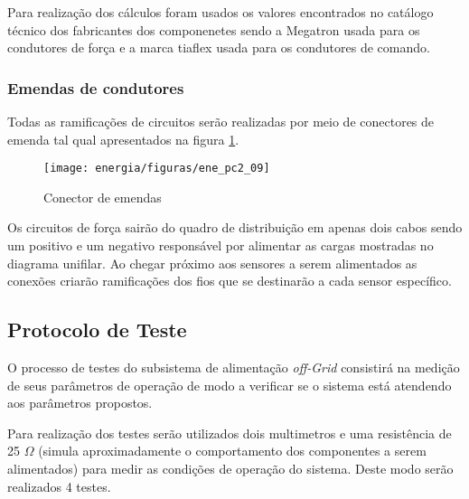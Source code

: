 Para realização dos cálculos foram usados os valores encontrados no catálogo técnico dos fabricantes dos componenetes sendo a Megatron usada para os condutores de força e a marca tiaflex usada para os condutores de comando.

\subsubsection{Emendas de condutores}

Todas as ramificações de circuitos serão realizadas por meio de conectores de emenda tal qual apresentados na figura \ref{ene_pc2_09}. 

\begin{figure}[H]
		\centering
		\texttt{[image: energia/figuras/ene\_pc2\_09]}
		\caption{Conector de emendas}
		\label{ene_pc2_09}
\end{figure}

Os circuitos de força sairão do quadro de distribuição em apenas dois cabos sendo um positivo e um negativo responsável por alimentar as cargas mostradas no diagrama unifilar. Ao chegar próximo aos sensores a serem alimentados as conexões criarão ramificações dos fios que se destinarão a cada sensor específico.

\subsection{Protocolo de Teste}

O processo de testes do subsistema de alimentação \textit{off-Grid} consistirá na medição de seus parâmetros de operação de modo a verificar se o sistema está atendendo aos parâmetros propostos.

Para realização dos testes serão utilizados dois multimetros e uma resistência de 25 $\Omega$ (simula aproximadamente o comportamento dos componentes a serem alimentados) para medir as condições de operação do sistema. Deste modo serão realizados 4 testes.

